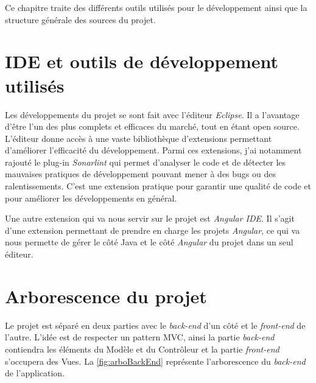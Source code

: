 \documentclass{polytech/polytech}
\begin{document}
Ce chapitre traite des différents outils utilisés pour le développement ainsi que la structure générale des sources du projet. 

\section{IDE et outils de développement utilisés}

Les développements du projet se sont fait avec l'éditeur \textit{Eclipse}. Il a l'avantage d'être l'un des plus complets et efficaces du marché, tout en étant open source. L'éditeur donne accès à une vaste bibliothèque d'extensions permettant d'améliorer l'efficacité du développement. Parmi ces extensions, j'ai notamment rajouté le plug-in \textit{Sonarlint} qui permet d'analyser le code et de détecter les mauvaises pratiques de développement pouvant mener à des bugs ou des ralentissements. C'est une extension pratique pour garantir une qualité de code et pour améliorer les développements en général.

Une autre extension qui va nous servir sur le projet est \textit{Angular IDE}. Il s'agit d'une extension permettant de prendre en charge les projets \textit{Angular}, ce qui va nous permette de gérer le côté Java et le côté \textit{Angular} du projet dans un seul éditeur. 

\section{Arborescence du projet}


Le projet est séparé en deux parties avec le \textit{back-end} d'un côté et le \textit{front-end} de l'autre. L'idée est de respecter un pattern MVC, ainsi la partie \textit{back-end} contiendra les éléments du Modèle et du Contrôleur et la partie \textit{front-end} s'occupera des Vues. La \autoref{fig:arboBackEnd} représente l'arborescence du \textit{back-end} de l'application.
\end{document}
